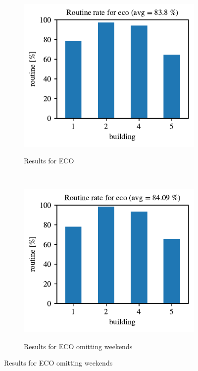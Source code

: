 \begin{figure}[H]
	\begin{subfigure}{.5\textwidth}
        \caption{Results for ECO}
        \includegraphics[width=1\textwidth]{Figures/EC/eco_res.pdf}
        \label{fig:eco_res}
    \end{subfigure}
    ~ 
    \begin{subfigure}{.5\textwidth}
        \caption{Results for ECO omitting weekends}
        \includegraphics[width=1\textwidth]{Figures/EC/eco_res_nw_1.pdf}
        \label{fig:eco_res_nw}
    \end{subfigure}
\end{figure}


